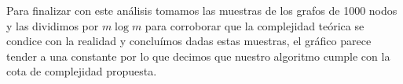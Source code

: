  Para finalizar con este análisis tomamos las muestras de los grafos de 1000 nodos y las dividimos por $m\log{}m$ para corroborar que la complejidad teórica se condice con la realidad y concluímos dadas estas muestras, el gráfico parece tender a una constante por lo que decimos que nuestro algoritmo cumple con la cota de complejidad propuesta.